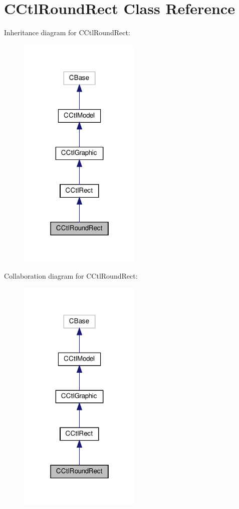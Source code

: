\hypertarget{classCCtlRoundRect}{}\section{C\+Ctl\+Round\+Rect Class Reference}
\label{classCCtlRoundRect}


Inheritance diagram for C\+Ctl\+Round\+Rect\+:
\nopagebreak
\begin{figure}[H]
\begin{center}
\leavevmode
\includegraphics[width=166pt]{classCCtlRoundRect__inherit__graph}
\end{center}
\end{figure}


Collaboration diagram for C\+Ctl\+Round\+Rect\+:
\nopagebreak
\begin{figure}[H]
\begin{center}
\leavevmode
\includegraphics[width=166pt]{classCCtlRoundRect__coll__graph}
\end{center}
\end{figure}
